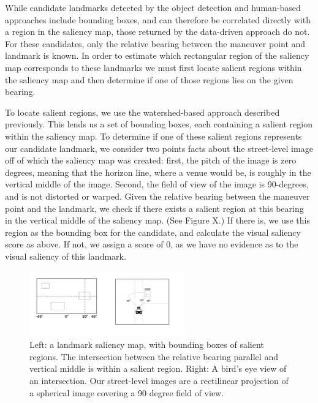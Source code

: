While candidate landmarks detected by the object detection and human-based approaches include bounding boxes, and can therefore be correlated directly with a region in the saliency map, those returned by the data-driven approach do not. For these candidates, only the relative bearing between the maneuver point and landmark is known. In order to estimate which rectangular region of the saliency map corresponds to these landmarks we must first locate salient regions within the saliency map and then determine if one of those regions lies on the given bearing.

To locate salient regions, we use the watershed-based approach described previously. This lends us a set of bounding boxes, each containing a salient region within the saliency map. To determine if one of these salient regions represents our candidate landmark, we consider two points facts about the street-level image off of which the saliency map was created: first, the pitch of the image is zero degrees, meaning that the horizon line, where a venue would be, is roughly in the vertical middle of the image. Second, the field of view of the image is 90-degrees, and is not distorted or warped. Given the relative bearing between the maneuver point and the landmark, we check if there exists a salient region at this bearing in the vertical middle of the saliency map. (See Figure X.) If there is, we use this region as the bounding box for the candidate, and calculate the visual saliency score as above. If not, we assign a score of 0, as we have no evidence as to the visual saliency of this landmark.

\begin{figure}[htbp]
  \centering
  \includegraphics[width=0.6\textwidth]{images/landmark_search.pdf}
  \caption{Left: a landmark saliency map, with bounding boxes of salient regions. The intersection between the relative bearing parallel and vertical middle is within a salient region. Right: A bird's eye view of an intersection. Our street-level images are a rectilinear projection of a spherical image covering a 90 degree field of view.}
  \label{fig:pipeline:mm}
\end{figure}

